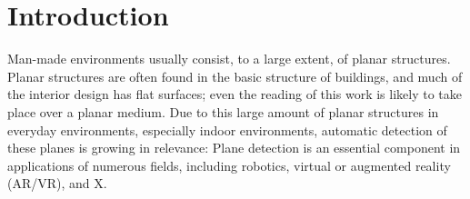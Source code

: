 \documentclass[main.tex]{subfiles}
\begin{document}
\chapter{Introduction}
\label{chap:Introduction}

Man-made environments usually consist, to a large extent, of planar structures. 
Planar structures are often found in the basic structure of buildings, and much of the interior design has flat surfaces; 
even the reading of this work is likely to take place over a planar medium. 
Due to this large amount of planar structures in everyday environments, especially indoor environments, automatic detection of these planes is growing in relevance: 
Plane detection is an essential component in applications of numerous fields,  including robotics, virtual or augmented reality (AR/VR), and X. 
\end{document}
